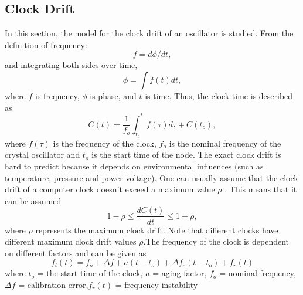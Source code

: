 \documentclass[journal]{IEEEtran}
\begin{document}
\subsection{\textbf{Clock Drift}}\noindent
In this section, the model for the clock drift of an oscillator is studied.
From the definition of frequency:
\begin{equation}
f = d\phi/dt \label{freq_defn} ,
\end{equation}
and integrating both sides over time,
 \begin{equation}
\phi =\int f(t)dt ,
 \end{equation}
where $f$ is frequency, $\phi$ is phase, and $t$ is time.\newline
Thus, the clock time is described as
\begin{equation}
C(t) = \frac{1}{f_o}\int_{t_o}^{t} {f(\tau)d\tau} + C(t_o) ,
\label{clock}
\end{equation}
where $f(\tau)$ is the frequency of the clock, $f_o$ is the nominal
frequency of the crystal oscillator and $t_o$ is the start time of
the node. The exact clock drift is hard to predict because it
depends on environmental influences (such as temperature, pressure
and power voltage). One can usually assume that the clock drift of a
computer clock doesn't exceed a maximum value $\rho$ . This means
that it can be assumed
\begin{equation}
1-\rho \leq \frac{dC(t)}{dt} \leq 1+\rho ,
\end{equation}
where $\rho$ represents the maximum clock drift.
\newline Note that different clocks have different maximum clock drift values
$\rho$.\newline The frequency of the clock is dependent on different
factors and can be given as
\begin{equation}
f_i(t) = f_o + \Delta f + a(t-t_o) + \Delta
f_e(t-t_o) + f_r(t) \label{frequency}
\end{equation}
where \newline $t_o$ = the start time of the clock, \newline $a$ =
aging factor,  \newline $f_o$ = nominal frequency, \newline $\Delta
f$ = calibration error,\newline $f_r(t)$ = frequency instability
\end{document}
